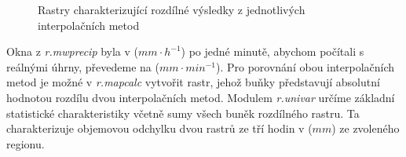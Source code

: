 \documentclass[a4paper,12pt,oneside]{report}
\begin{document}
\begin{figure}[h!]%
    \centering
    \qquad
    \qquad
    \qquad
    \caption[Průměr metod]{ Rastry charakterizující rozdílné výsledky z jednotlivých interpolačních metod\centering}

\end{figure}


Okna z \textit{r.mwprecip} byla v ($mm \cdot h^{-1}$) po jedné minutě,
abychom počítali s reálnými úhrny, převedeme na ($mm \cdot min^{-1}$).
Pro porovnání obou interpolačních metod je možné v \textit{r.mapcalc}
vytvořit rastr, jehož buňky představují absolutní hodnotou rozdílu
dvou interpolačních metod. Modulem \textit{r.univar} určíme základní
statistické charakteristiky včetně sumy všech buněk rozdílného
rastru. Ta charakterizuje objemovou odchylku dvou rastrů ze tří hodin
v ($mm$) ze zvoleného regionu.
\end{document}
